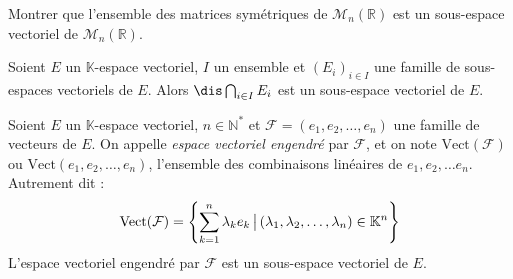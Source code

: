 \documentclass[a4paper,10pt]{report}
\begin{document}
\begin{exa} Montrer que l'ensemble des matrices symétriques de $\mathcal{M}_n(\mathbb{R})$ est un sous-espace vectoriel de $\mathcal{M}_n(\mathbb{R})$. \end{exa}

\begin{prop}
Soient $E$ un $\mathbb{K}$-espace vectoriel, $I$ un ensemble et $(E_i)_{i \in I}$ une famille de sous-espaces vectoriels de $E$. Alors $\dis \bigcap_{i \in I} E_i$ est un sous-espace vectoriel de $E$.
\end{prop}

\begin{preuve}
\vspace{5cm}
\end{preuve}

\begin{defip}
Soient $E$ un $\mathbb{K}$-espace vectoriel, $n \in \mathbb{N}^*$ et $\mathcal{F}=(e_1, e_2, \ldots, e_n)$ une famille de vecteurs de $E$. On appelle \textit{espace vectoriel engendré} par $\mathcal{F}$, et on note $\textrm{Vect}(\mathcal{F})$ ou $\textrm{Vect}(e_1, e_2, \ldots, e_n)$, l'ensemble des combinaisons linéaires de $e_1, e_2, \ldots e_n$. Autrement dit :
$$ \textrm{Vect}(\mathcal{F}) = \left\lbrace \sum_{k=1}^n \lambda_k e_k \, \big{\vert} \,  (\lambda_1, \lambda_2, \ldots, \lambda_n) \in \mathbb{K}^n \right\rbrace$$
L'espace vectoriel engendré par $\mathcal{F}$ est un sous-espace vectoriel de $E$.
\end{defip}

\begin{preuve}
\vspace{6cm}
\end{preuve}
\end{document}
